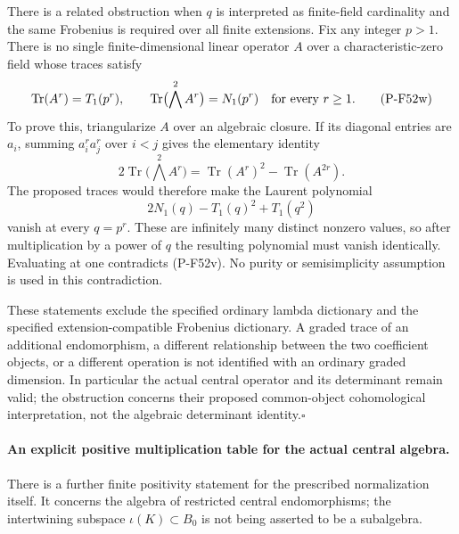 There is a related obstruction when $q$ is interpreted as
finite-field cardinality and the same Frobenius is required
over all finite extensions. Fix any integer $p>1$. There is
no single finite-dimensional linear operator $A$ over a
characteristic-zero field whose traces satisfy
\[
 \operatorname{Tr}(A^r)=T_1(p^r),\qquad
 \operatorname{Tr}\bigl(\bigwedge^2 A^r\bigr)=N_1(p^r)
                   \quad\hbox{for every }r\ge1.
                                                        \tag{P-F52w}
\]
To prove this, triangularize $A$ over an algebraic closure.
If its diagonal entries are $a_i$, summing
$a_i^r a_j^r$ over $i<j$ gives the elementary identity
\[
 2\operatorname{Tr}\bigl(\bigwedge^2 A^r\bigr)
       =\operatorname{Tr}(A^r)^2-\operatorname{Tr}(A^{2r}).
\]
The proposed traces would therefore make the Laurent
polynomial
\[
       2N_1(q)-T_1(q)^2+T_1(q^2)
                                                        \tag{P-F52x}
\]
vanish at every $q=p^r$. These are infinitely many distinct
nonzero values, so after multiplication by a power of $q$
the resulting polynomial must vanish identically. Evaluating
at one contradicts (P-F52v). No purity or semisimplicity
assumption is used in this contradiction.

These statements exclude the specified ordinary lambda
dictionary and the specified extension-compatible Frobenius
dictionary. A graded trace of an additional endomorphism,
a different relationship between the two coefficient objects,
or a different operation is not identified with an ordinary
graded dimension. In particular the actual central operator
and its determinant remain valid; the obstruction concerns
their proposed common-object cohomological interpretation,
not the algebraic determinant identity.\hfill$\square$

\paragraph{An explicit positive multiplication table for the actual central algebra.}
There is a further finite positivity statement for the prescribed
normalization itself. It concerns the algebra of restricted central
endomorphisms; the intertwining subspace $\iota(K)\subset B_0$ is
not being asserted to be a subalgebra.

